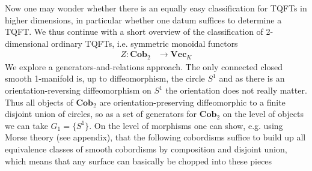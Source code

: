 Now one may wonder whether there is an equally easy classification for TQFTs in higher dimensions, in particular whether one datum suffices to determine a TQFT. We thus continue with a short overview of the classification of 2-dimensional ordinary TQFTs, i.e. symmetric monoidal functors
\begin{align*}
  Z
  \colon
  \mathbf{Cob}_{2}
  &\to
  \mathbf{Vec}_{K}
\end{align*}
We explore a generators-and-relations approach. The only connected closed smooth 1-manifold is, up to diffeomorphism, the circle $S^{1}$ and as there is an orientation-reversing diffeomorphism on $S^{1}$ the orientation does not really matter. Thus all objects of $\mathbf{Cob}_{2}$ are orientation-preserving diffeomorphic to a finite disjoint union of circles, so as a set of generators for $\mathbf{Cob}_{2}$ on the level of objects we can take $G_{1} = \lbrace S^{1} \rbrace$. On the level of morphisms one can show, e.g. using Morse theory (see appendix), that the following cobordisms suffice to build up all equivalence classes of smooth cobordisms by composition and disjoint union, which means that any surface can basically be chopped into these pieces
\\
